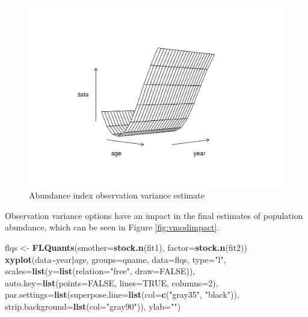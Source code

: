 \documentclass[
]{book}
\newenvironment{Shaded}{\begin{snugshade}}{\end{snugshade}}
\newcommand{\AttributeTok}[1]{\textcolor[rgb]{0.13,0.29,0.53}{#1}}
\newcommand{\ConstantTok}[1]{\textcolor[rgb]{0.56,0.35,0.01}{#1}}
\newcommand{\DecValTok}[1]{\textcolor[rgb]{0.00,0.00,0.81}{#1}}
\newcommand{\FunctionTok}[1]{\textcolor[rgb]{0.13,0.29,0.53}{\textbf{#1}}}
\newcommand{\NormalTok}[1]{#1}
\newcommand{\OtherTok}[1]{\textcolor[rgb]{0.56,0.35,0.01}{#1}}
\newcommand{\SpecialCharTok}[1]{\textcolor[rgb]{0.81,0.36,0.00}{\textbf{#1}}}
\newcommand{\StringTok}[1]{\textcolor[rgb]{0.31,0.60,0.02}{#1}}
\begin{document}
\begin{figure}
\centering
\includegraphics{_bookdown_files/_main_files/figure-html/vmod-1.png}
\caption{\label{fig:vmod}Abundance index observation variance estimate}
\end{figure}

Observation variance options have an impact in the final estimates of population abundance, which can be seen in Figure \ref{fig:vmodimpact}.

\begin{Shaded}
\begin{Highlighting}[]
\NormalTok{flqs }\OtherTok{\textless{}{-}} \FunctionTok{FLQuants}\NormalTok{(}\AttributeTok{smother=}\FunctionTok{stock.n}\NormalTok{(fit1), }\AttributeTok{factor=}\FunctionTok{stock.n}\NormalTok{(fit2))}
\FunctionTok{xyplot}\NormalTok{(data}\SpecialCharTok{\textasciitilde{}}\NormalTok{year}\SpecialCharTok{|}\NormalTok{age, }\AttributeTok{groups=}\NormalTok{qname, }\AttributeTok{data=}\NormalTok{flqs, }\AttributeTok{type=}\StringTok{"l"}\NormalTok{,}
       \AttributeTok{scales=}\FunctionTok{list}\NormalTok{(}\AttributeTok{y=}\FunctionTok{list}\NormalTok{(}\AttributeTok{relation=}\StringTok{"free"}\NormalTok{, }\AttributeTok{draw=}\ConstantTok{FALSE}\NormalTok{)),}
       \AttributeTok{auto.key=}\FunctionTok{list}\NormalTok{(}\AttributeTok{points=}\ConstantTok{FALSE}\NormalTok{, }\AttributeTok{lines=}\ConstantTok{TRUE}\NormalTok{, }\AttributeTok{columns=}\DecValTok{2}\NormalTok{),}
       \AttributeTok{par.settings=}\FunctionTok{list}\NormalTok{(}\AttributeTok{superpose.line=}\FunctionTok{list}\NormalTok{(}\AttributeTok{col=}\FunctionTok{c}\NormalTok{(}\StringTok{"gray35"}\NormalTok{, }\StringTok{"black"}\NormalTok{)),}
       \AttributeTok{strip.background=}\FunctionTok{list}\NormalTok{(}\AttributeTok{col=}\StringTok{"gray90"}\NormalTok{)), }\AttributeTok{ylab=}\StringTok{""}\NormalTok{)}
\end{Highlighting}
\end{Shaded}
\end{document}
